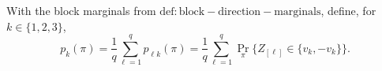 With the block marginals from \(\mathrm{def:block-direction-marginals}\), define, for \(k\in\{1,2,3\}\),
\[
p_k(\pi)=\frac1q\sum_{\ell=1}^qp_{\ell k}(\pi)
=\frac1q\sum_{\ell=1}^q
\Pr_\pi\{Z_{[\ell]}\in\{v_k,-v_k\}\}.
\]